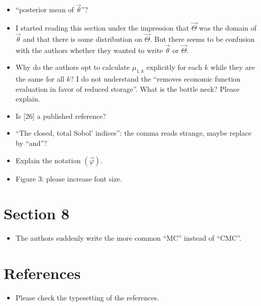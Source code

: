 \documentclass{article}[12pt]
\newcommand{\RefereeTODO}[1]{{\color{red} #1 \newline}}
\begin{document}
\begin{itemize}
    \item \RefereeTODO{``posterior mean of $\vec{\theta}$''?}
    \item \RefereeTODO{I started reading this section under the impression that $\vec{\Theta}$ was the domain of $\vec{\theta}$ and that there is some distribution on $\vec{\Theta}$. But there seems to be confusion with the authors whether they wanted to write $\vec{\theta}$ or $\vec{\Theta}$.}
    \item \RefereeTODO{Why do the authors opt to calculate $\mu_{1,k}$ explicitly for each $k$ while they are the same for all $k$? I do not understand the ``removes economic function evaluation in favor of reduced storage''. What is the bottle neck? Please explain.}
    \item \RefereeTODO{Is [26] a published reference?}
    \item \RefereeTODO{``The closed, total Sobol' indices'': the comma reads strange, maybe replace by ``and''?}
    \item \RefereeTODO{Explain the notation $(\vec{\varphi})$.}
    \item \RefereeTODO{Figure 3: please increase font size.}
\end{itemize}

\section{Section 8}

\begin{itemize}
    \item \RefereeTODO{The authors suddenly write the more common ``MC'' instead of ``CMC''.}
\end{itemize}

\section{References}

\begin{itemize}
    \item \RefereeTODO{Please check the typesetting of the references.}
\end{itemize}
\end{document}
